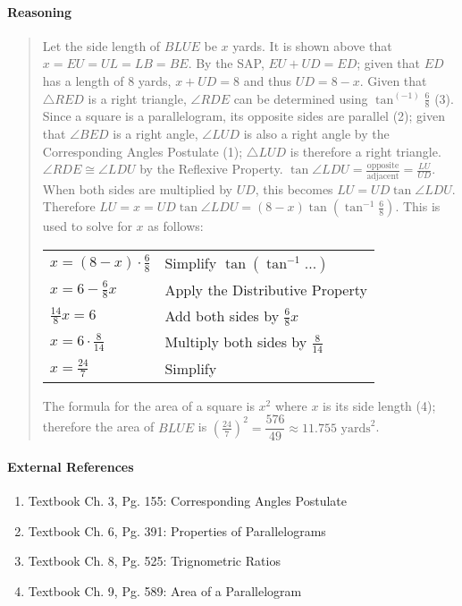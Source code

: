 \documentclass[letterpaper,12pt,twoside]{report}
\begin{document}
	\paragraph{Reasoning}
	\begin{quotation}
		
		Let the side length of $BLUE$ be $x$ yards. It is shown above that $x=EU=UL=LB=BE$. By the SAP, $EU+UD=ED$; given that $ED$ has a length of 8 yards, $x+UD=8$ and thus $UD=8-x$. Given that $\triangle RED$ is a right triangle, $\angle RDE$ can be determined using $\tan^(-1) \frac{6}{8}$ (3). Since a square is a parallelogram, its opposite sides are parallel (2); given that $\angle BED$ is a right angle, $\angle LUD$ is also a right angle by the Corresponding Angles Postulate (1); $\triangle LUD$ is therefore a right triangle. $\angle RDE \cong \angle LDU$ by the Reflexive Property. $\tan \angle LDU = \frac{\text{opposite}}{\text{adjacent}} = \frac{LU}{UD}$. When both sides are multiplied by $UD$, this becomes $LU=UD \tan \angle LDU$. Therefore $LU=x=UD \tan \angle LDU=(8-x)\tan (\tan^{-1} \frac{6}{8})$. This is used to solve for $x$ as follows:
		
		\begin{center}
			\begin{tabular}{l | l}
				$x=(8-x) \cdot \frac{6}{8}$ & Simplify $\tan(\tan^{-1} ...)$ \\
				$x=6-\frac{6}{8}x$ & Apply the Distributive Property \\
				$\frac{14}{8}x=6$ & Add both sides by $\frac{6}{8}x$ \\
				$x=6 \cdot \frac{8}{14}$ & Multiply both sides by $\frac{8}{14}$ \\
				$x=\frac{24}{7}$ & Simplify
			\end{tabular}
		\end{center}
		
		The formula for the area of a square is $x^2$ where $x$ is its side length (4); therefore the area of $BLUE$ is $(\frac{24}{7})^2=\boxed{\dfrac{576}{49} \approx 11.755 \text{  yards}^2}$.
	\end{quotation}
	
	\paragraph{External References}
	
	\begin{enumerate}
		\item Textbook Ch. 3, Pg. 155: Corresponding Angles Postulate
		\item Textbook Ch. 6, Pg. 391: Properties of Parallelograms
		\item Textbook Ch. 8, Pg. 525: Trignometric Ratios
		\item Textbook Ch. 9, Pg. 589: Area of a Parallelogram
	\end{enumerate}
	
\end{document}
